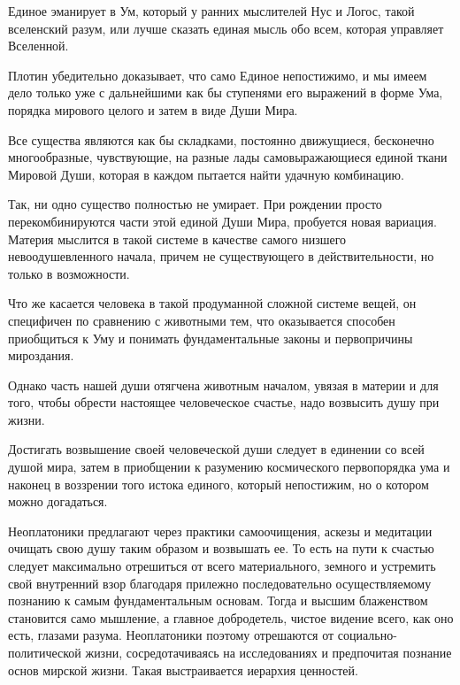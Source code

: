 Единое эманирует в Ум, который у ранних мыслителей Нус и Логос, такой вселенский разум, или лучше сказать единая мысль обо всем, которая управляет Вселенной. 

Плотин убедительно доказывает, что само Единое непостижимо, и мы имеем дело только уже с дальнейшими как бы ступенями его выражений в форме Ума, порядка мирового целого и затем в виде Души Мира. 

Все существа являются как бы складками, постоянно движущиеся, бесконечно многообразные, чувствующие, на разные лады самовыражающиеся единой ткани Мировой Души, которая в каждом пытается найти удачную комбинацию. 

Так, ни одно существо полностью не умирает. При рождении просто перекомбинируются части этой единой Души Мира, пробуется новая вариация. Материя мыслится в такой системе в качестве самого низшего невоодушевленного начала, причем не существующего в действительности, но только в возможности. 


Что же касается человека в такой продуманной сложной системе вещей, он специфичен по сравнению с животными тем, что оказывается способен приобщиться к Уму и понимать фундаментальные законы и первопричины мироздания.

Однако часть нашей души отягчена животным началом, увязая в материи и для того, чтобы обрести настоящее человеческое счастье, надо возвысить душу при жизни.

Достигать возвышение своей человеческой души следует в единении со всей душой мира, затем в приобщении к разумению космического первопорядка ума и наконец в воззрении того истока единого, который непостижим, но о котором можно догадаться. 

Неоплатоники предлагают через практики самоочищения, аскезы и медитации очищать свою душу таким образом и возвышать ее. То есть на пути к счастью следует максимально отрешиться от всего материального, земного и устремить свой внутренний взор благодаря прилежно последовательно осуществляемому познанию к самым фундаментальным основам. 
Тогда и высшим блаженством становится само мышление, а главное добродетель, чистое видение всего, как оно есть, глазами разума. Неоплатоники поэтому отрешаются от социально-политической жизни, сосредотачиваясь на исследованиях и предпочитая познание основ мирской жизни. Такая выстраивается иерархия ценностей.


